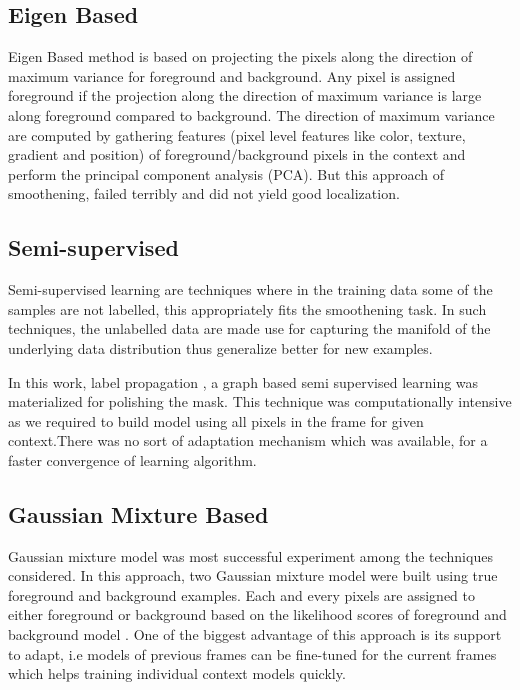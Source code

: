 \subsection{Eigen Based}
Eigen Based method is based on projecting the pixels along the direction of maximum variance for foreground and background. Any pixel is assigned foreground if the projection along the direction of maximum variance is large along foreground compared to background. The direction of maximum variance are computed by gathering features (pixel level features like color, texture, gradient and position) of foreground/background pixels in the context and perform the principal component analysis (PCA). But this approach of smoothening, failed terribly and did not yield good localization.

\subsection{Semi-supervised}
Semi-supervised learning are techniques where in the training data some of the samples are not labelled, this appropriately fits the smoothening task. In such techniques, the unlabelled data are made use for capturing the manifold of the underlying data distribution thus generalize better for new examples. 
\par In this work, label propagation \citep{labprop}, a graph based semi supervised learning was materialized for polishing the mask. This technique was computationally intensive as we required to build model using all pixels in the frame for given context.There was no sort of adaptation mechanism which was available, for a faster convergence of learning algorithm.

\subsection{Gaussian Mixture Based}
Gaussian mixture model was  most successful experiment among the techniques considered.  In this approach, two Gaussian mixture model were built using true foreground and background  examples. Each and every pixels are assigned to either foreground or background based on the likelihood scores of foreground and background model . One of the biggest advantage of this approach is its support to adapt, i.e models of previous frames can be fine-tuned for the current frames which helps training individual context models quickly.

